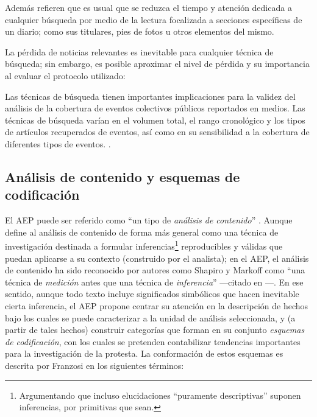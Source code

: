\documentclass[letterpaper, 11pt]{book}
\theoremstyle{definition}
\theoremstyle{remark}
\begin{document}
Además refieren que es usual que se reduzca el tiempo y atención dedicada a cualquier búsqueda por medio de la lectura focalizada a secciones específicas de un diario; como sus titulares, pies de fotos u otros elementos del mismo.

La pérdida de noticias relevantes es inevitable para cualquier técnica de búsqueda; sin embargo, es posible aproximar el nivel de pérdida y su importancia al evaluar el protocolo utilizado:

\begin{center}
    \begin{minipage}{0.9\linewidth}
        {\setlength{\parindent}{12pt}\small
        Las técnicas de búsqueda tienen importantes implicaciones para la validez del análisis de la cobertura de eventos colectivos públicos reportados en medios. 
        Las técnicas de búsqueda varían en el volumen total, el rango cronológico y los tipos de artículos recuperados de eventos, así como en su sensibilidad a la cobertura de diferentes tipos de eventos. \citep[136]{2001_Maney_Oliver__FindingEvents}.
        }
    \end{minipage}
\end{center}




\subsection{Análisis de contenido y esquemas de codificación}
\label{sec:AEP_analisisContenido}

El AEP puede ser referido como ``un tipo de \emph{análisis de contenido}'' \citep[335]{2014_Hutter_AEP}. 
Aunque \citet{1990_Krippendorff_ContentAnalysis} define al análisis de contenido de forma más general como una técnica de investigación destinada a formular inferencias\footnote{Argumentando que incluso elucidaciones ``puramente descriptivas'' suponen inferencias, por primitivas que sean.} reproducibles y válidas que puedan aplicarse a su contexto (construido por el analista); en el AEP, el análisis de contenido ha sido reconocido por autores como Shapiro y Markoff como ``una técnica de \emph{medición} antes que una técnica de \emph{inferencia}'' ---citado en \citep[122]{2003_Wada_Tesis}---. 
En ese sentido, aunque todo texto incluye significados simbólicos que hacen inevitable cierta inferencia, el AEP propone centrar su atención en la descripción de hechos bajo los cuales se puede caracterizar a la unidad de análisis seleccionada, y (a partir de tales hechos) construir categorías que forman en su conjunto \emph{esquemas de codificación}, con los cuales se pretenden contabilizar tendencias importantes para la investigación de la protesta. 
La conformación de estos esquemas es descrita por Franzosi en los siguientes términos:
\end{document}
